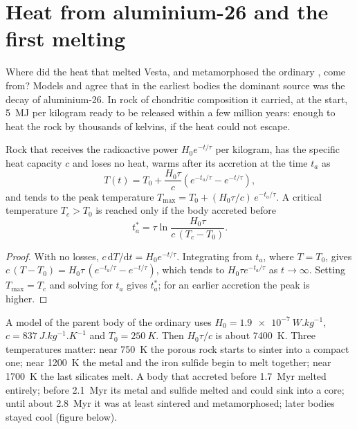 \section{Heat from aluminium-26 and the first melting}

Where did the heat that melted Vesta, and metamorphosed the ordinary
, come from? Models and  agree that in the earliest bodies
the dominant source was the decay of aluminium-26. In rock of chondritic composition it carried, at the start,
\qty{5}{MJ} per kilogram ready to be released within a few million years:
enough to heat the rock by thousands of kelvins, if the heat could not escape.

\begin{proposition}
\label{prop:b2:planet-formation-meteorites:heating}
Rock that receives the radioactive power $H_0 e^{-t/\tau}$ per kilogram, has
the specific heat capacity $c$ and loses no heat, warms after its accretion at
the time $t_a$ as
\[
  T(t) = T_0 + \frac{H_0\tau}{c}\left(e^{-t_a/\tau} - e^{-t/\tau}\right),
\]
and tends to the peak temperature
$T_{\max} = T_0 + (H_0\tau/c)\,e^{-t_a/\tau}$. A critical temperature
$T_c > T_0$ is reached only if the body accreted before
\[
  t_a^* = \tau\ln\frac{H_0\tau}{c\,(T_c - T_0)}.
\]
\end{proposition}

\begin{proof}
With no losses, $c\,\mathrm dT/\mathrm dt = H_0 e^{-t/\tau}$. Integrating from
$t_a$, where $T = T_0$, gives
$c\,(T - T_0) = H_0\tau\,(e^{-t_a/\tau} - e^{-t/\tau})$, which tends to
$H_0\tau e^{-t_a/\tau}$ as $t \to \infty$. Setting $T_{\max} = T_c$ and solving
for $t_a$ gives $t_a^*$; for an earlier accretion the peak is higher.
\end{proof}

A model of the parent body of the ordinary  uses
$H_0 = \qty{1.9e-7}{W.kg^{-1}}$, $c = \qty{837}{J.kg^{-1}.K^{-1}}$ and
$T_0 = \qty{250}{K}$. Then $H_0\tau/c$ is about \qty{7400}{K}. Three
temperatures matter: near \qty{750}{K} the porous rock starts to sinter into a
compact one; near \qty{1200}{K} the metal and the iron sulfide begin to melt
together; near \qty{1700}{K} the last silicates melt. A body that accreted
before \qty{1.7}{Myr} melted entirely; before \qty{2.1}{Myr} its metal and sulfide
melted and could sink into a core; until about \qty{2.8}{Myr} it was at least
sintered and metamorphosed; later bodies stayed cool (figure below).

